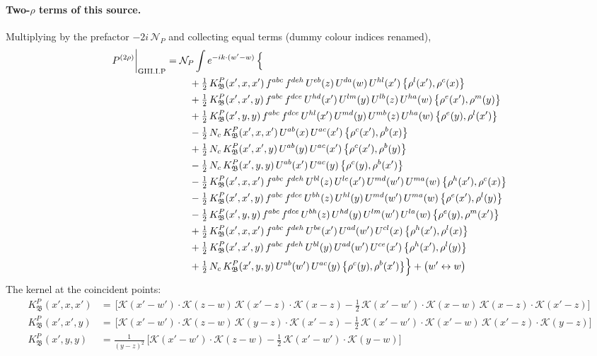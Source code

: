 \documentclass[10pt]{article}
\numberwithin{equation}{section}
\newcommand{\KK}{\mathcal K}
\newcommand{\NP}{\mathcal N_{P}}
\begin{document}
\paragraph{Two-$\rho$ terms of this source.} Multiplying by the prefactor $-2i\,\NP$ and collecting equal terms (dummy colour indices renamed),
\begin{align}
P^{(2\rho)}\bigg|_{\rm GIII.I.P}={}&\NP\int e^{-ik\cdot(w'-w)}\,\Big\{\notag\\
&\quad +\tfrac12\,K^{P}_{\mathfrak B}(x',x,x')\,f^{abc}\,f^{deh}\,U^{eb}(z)\,U^{da}(w)\,U^{hl}(x')\,\big\{\rho^{l}(x'),\rho^{c}(x)\big\}\notag\\
&\quad +\tfrac12\,K^{P}_{\mathfrak B}(x',x',y)\,f^{abc}\,f^{dce}\,U^{hd}(x')\,U^{lm}(y)\,U^{lb}(z)\,U^{ha}(w)\,\big\{\rho^{e}(x'),\rho^{m}(y)\big\}\notag\\
&\quad +\tfrac12\,K^{P}_{\mathfrak B}(x',y,y)\,f^{abc}\,f^{dce}\,U^{hl}(x')\,U^{md}(y)\,U^{mb}(z)\,U^{ha}(w)\,\big\{\rho^{e}(y),\rho^{l}(x')\big\}\notag\\
&\quad -\tfrac12\,N_{c}\,K^{P}_{\mathfrak B}(x',x,x')\,U^{ab}(x)\,U^{ac}(x')\,\big\{\rho^{c}(x'),\rho^{b}(x)\big\}\notag\\
&\quad +\tfrac12\,N_{c}\,K^{P}_{\mathfrak B}(x',x',y)\,U^{ab}(y)\,U^{ac}(x')\,\big\{\rho^{c}(x'),\rho^{b}(y)\big\}\notag\\
&\quad -\tfrac12\,N_{c}\,K^{P}_{\mathfrak B}(x',y,y)\,U^{ab}(x')\,U^{ac}(y)\,\big\{\rho^{c}(y),\rho^{b}(x')\big\}\notag\\
&\quad -\tfrac12\,K^{P}_{\mathfrak B}(x',x,x')\,f^{abc}\,f^{deh}\,U^{bl}(z)\,U^{le}(x')\,U^{md}(w')\,U^{ma}(w)\,\big\{\rho^{h}(x'),\rho^{c}(x)\big\}\notag\\
&\quad -\tfrac12\,K^{P}_{\mathfrak B}(x',x',y)\,f^{abc}\,f^{dce}\,U^{bh}(z)\,U^{hl}(y)\,U^{md}(w')\,U^{ma}(w)\,\big\{\rho^{e}(x'),\rho^{l}(y)\big\}\notag\\
&\quad -\tfrac12\,K^{P}_{\mathfrak B}(x',y,y)\,f^{abc}\,f^{dce}\,U^{bh}(z)\,U^{hd}(y)\,U^{lm}(w')\,U^{la}(w)\,\big\{\rho^{e}(y),\rho^{m}(x')\big\}\notag\\
&\quad +\tfrac12\,K^{P}_{\mathfrak B}(x',x,x')\,f^{abc}\,f^{deh}\,U^{be}(x')\,U^{ad}(w')\,U^{cl}(x)\,\big\{\rho^{h}(x'),\rho^{l}(x)\big\}\notag\\
&\quad +\tfrac12\,K^{P}_{\mathfrak B}(x',x',y)\,f^{abc}\,f^{deh}\,U^{bl}(y)\,U^{ad}(w')\,U^{ce}(x')\,\big\{\rho^{h}(x'),\rho^{l}(y)\big\}\notag\\
&\quad +\tfrac12\,N_{c}\,K^{P}_{\mathfrak B}(x',y,y)\,U^{ab}(w')\,U^{ac}(y)\,\big\{\rho^{c}(y),\rho^{b}(x')\big\}\Big\}+\big(w'\leftrightarrow w\big)\label{B:eq:res-GIII.I.P}
\end{align}
The kernel at the coincident points:
\begin{align*}
K^{P}_{\mathfrak B}(x',x,x')&=\,\Big[\KK(x'-w')\cdot\KK(z-w)\,\KK(x'-z)\cdot\KK(x-z)-\frac{1}{2}\,\KK(x'-w')\cdot\KK(x-w)\,\KK(x-z)\cdot\KK(x'-z)\Big]\\K^{P}_{\mathfrak B}(x',x',y)&=\,\Big[\KK(x'-w')\cdot\KK(z-w)\,\KK(y-z)\cdot\KK(x'-z)-\frac{1}{2}\,\KK(x'-w')\cdot\KK(x'-w)\,\KK(x'-z)\cdot\KK(y-z)\Big]\\K^{P}_{\mathfrak B}(x',y,y)&=\frac{1}{(y-z)^2}\,\Big[\KK(x'-w')\cdot\KK(z-w)-\frac{1}{2}\,\KK(x'-w')\cdot\KK(y-w)\Big]
\end{align*}
\end{document}
